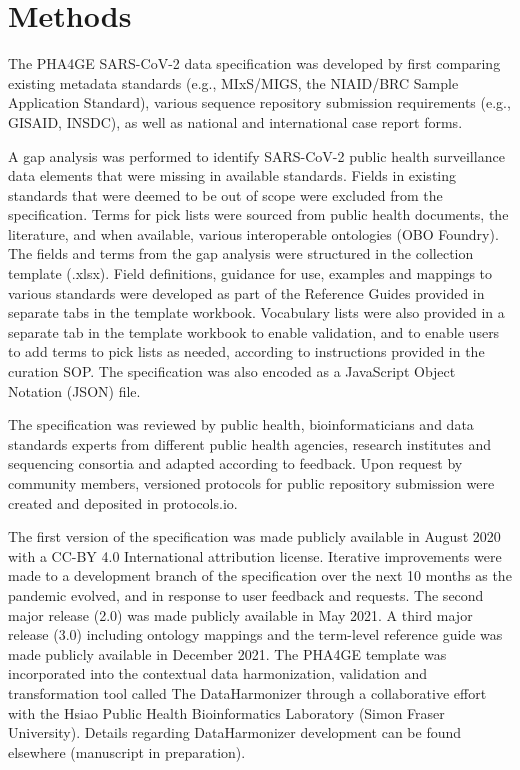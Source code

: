 \section{Methods}

The PHA4GE SARS-CoV-2 data specification was developed by first comparing existing metadata standards (e.g., MIxS/MIGS, the NIAID/BRC Sample Application Standard), various sequence repository submission requirements (e.g., GISAID, INSDC), as well as national and international case report forms. 

A gap analysis was performed to identify SARS-CoV-2 public health surveillance data elements that were missing in available standards. Fields in existing standards that were deemed to be out of scope were excluded from the specification. Terms for pick lists were sourced from public health documents, the literature, and when available, various interoperable ontologies (OBO Foundry). The fields and terms from the gap analysis were structured in the collection template (.xlsx). Field definitions, guidance for use, examples and mappings to various standards were developed as part of the Reference Guides provided in separate tabs in the template workbook. Vocabulary lists were also provided in a separate tab in the template workbook to enable validation, and to enable users to add terms to pick lists as needed, according to instructions provided in the curation SOP. The specification was also encoded as a JavaScript Object Notation (JSON) file. 

The specification was reviewed by public health, bioinformaticians and data standards experts from different public health agencies, research institutes and sequencing consortia and adapted according to feedback. Upon request by community members, versioned protocols for public repository submission were created and deposited in protocols.io.

The first version of the specification was made publicly available in August 2020 with a CC-BY 4.0 International attribution license. Iterative improvements were made to a development branch of the specification over the next 10 months as the pandemic evolved, and in response to user feedback and requests. The second major release (2.0) was made publicly available in May 2021. A third major release (3.0) including ontology mappings and the term-level reference guide was made publicly available in December 2021. The PHA4GE template was incorporated into the contextual data harmonization, validation and transformation tool called The DataHarmonizer through a collaborative effort with the Hsiao Public Health Bioinformatics Laboratory (Simon Fraser University). Details regarding DataHarmonizer development can be found elsewhere (manuscript in preparation).


